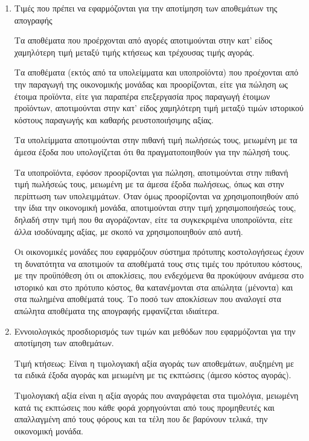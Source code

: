 \documentclass[A4,10pt,greek]{book}
\begin{document}
\begin{enumerate}

\item Τιμές που πρέπει να εφαρμόζονται για την αποτίμηση των αποθεμάτων της απογραφής

Τα αποθέματα που προέρχονται από αγορές αποτιμούνται στην κατ' είδος χαμηλότερη τιμή μεταξύ τιμής κτήσεως και τρέχουσας τιμής αγοράς.

Τα αποθέματα (εκτός από τα υπολείμματα και υποπροϊόντα) που προέχονται από την παραγωγή της οικονομικής μονάδας και προορίζονται, είτε για πώληση ως έτοιμα προϊόντα, είτε για παραπέρα επεξεργασία προς παραγωγή έτοιμων προϊόντων, αποτιμούνται στην κατ' είδος χαμηλότερη τιμή μεταξύ τιμών ιστορικού κόστους παραγωγής και καθαρής ρευστοποιήσιμης αξίας.

Τα υπολείμματα αποτιμούνται στην πιθανή τιμή πωλήσεώς τους, μειωμένη με τα άμεσα έξοδα που υπολογίζεται ότι θα πραγματοποιηθούν για την πώλησή τους.

Τα υποπροϊόντα, εφόσον προορίζονται για πώληση, αποτιμούνται στην πιθανή τιμή πωλήσεώς τους, μειωμένη με τα άμεσα έξοδα πωλήσεως, όπως και στην περίπτωση των υπολειμμάτων. Όταν όμως προορίζονται να χρησιμοποιηθούν από την ίδια την οικονομική μονάδα, αποτιμούνται στην τιμή χρησιμοποιήσεώς τους, δηλαδή στην τιμή που θα αγοράζονταν, είτε τα συγκεκριμένα υποπροϊόντα, είτε άλλα ισοδύναμης αξίας, με σκοπό να χρησιμοποιηθούν από αυτή.

Οι οικονομικές μονάδες που εφαρμόζουν σύστημα πρότυπης κοστολογήσεως έχουν τη δυνατότητα να αποτιμούν τα αποθέματά τους στις τιμές του πρότυπου κόστους, με την προϋπόθεση ότι οι αποκλίσεις, που ενδεχόμενα θα προκύψουν ανάμεσα στο ιστορικό και στο πρότυπο κόστος, θα κατανέμονται στα απώλητα (μένοντα) και στα πωλημένα αποθέματά τους. Το ποσό των αποκλίσεων που αναλογεί στα απώλητα αποθέματα της απογραφής εμφανίζεται ιδιαίτερα.

\item Εννοιολογικός προσδιορισμός των τιμών και μεθόδων που εφαρμόζονται για την αποτίμηση των αποθεμάτων.

Τιμή κτήσεως: Είναι η τιμολογιακή αξία αγοράς των αποθεμάτων, αυξημένη με τα ειδικά έξοδα αγοράς και μειωμένη με τις εκπτώσεις (άμεσο κόστος αγοράς).

Τιμολογιακή αξία είναι η αξία αγοράς που αναγράφεται στα τιμολόγια, μειωμένη κατά τις εκπτώσεις που κάθε φορά χορηγούνται από τους προμηθευτές και απαλλαγμένη από τους φόρους και τα τέλη που δε βαρύνουν τελικά, την οικονομική μονάδα.


\end{enumerate}
\end{document}
